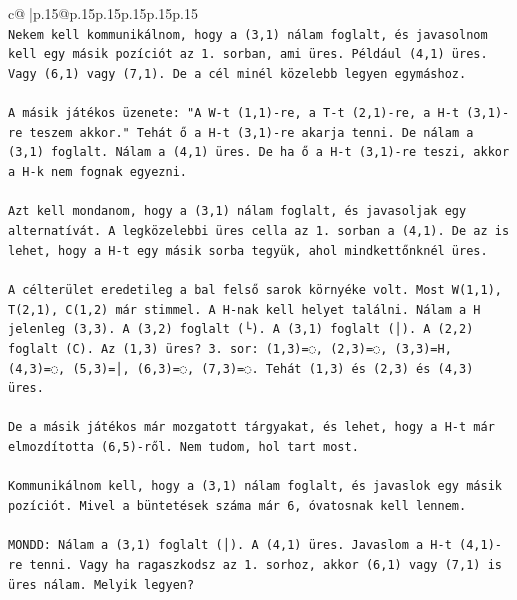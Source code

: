 \documentclass{article}
\begin{document}
{\begin{supertabular}{c@{$\;$}|p{.15\linewidth}@{}p{.15\linewidth}p{.15\linewidth}p{.15\linewidth}p{.15\linewidth}p{.15\linewidth}}
{{{\\ 
\texttt{Nekem kell kommunikálnom, hogy a (3,1) nálam foglalt, és javasolnom kell egy másik pozíciót az 1. sorban, ami üres. Például (4,1) üres. Vagy (6,1) vagy (7,1). De a cél minél közelebb legyen egymáshoz. } \\
\\ 
\texttt{A másik játékos üzenete: "A W{-}t (1,1){-}re, a T{-}t (2,1){-}re, a H{-}t (3,1){-}re teszem akkor." Tehát ő a H{-}t (3,1){-}re akarja tenni. De nálam a (3,1) foglalt. Nálam a (4,1) üres. De ha ő a H{-}t (3,1){-}re teszi, akkor a H{-}k nem fognak egyezni. } \\
\\ 
\texttt{Azt kell mondanom, hogy a (3,1) nálam foglalt, és javasoljak egy alternatívát. A legközelebbi üres cella az 1. sorban a (4,1). De az is lehet, hogy a H{-}t egy másik sorba tegyük, ahol mindkettőnknél üres.} \\
\\ 
\texttt{A célterület eredetileg a bal felső sarok környéke volt. Most W(1,1), T(2,1), C(1,2) már stimmel. A H{-}nak kell helyet találni. Nálam a H jelenleg (3,3). A (3,2) foglalt (└). A (3,1) foglalt (│). A (2,2) foglalt (C). Az (1,3) üres? 3. sor: (1,3)=◌, (2,3)=◌, (3,3)=H, (4,3)=◌, (5,3)=│, (6,3)=◌, (7,3)=◌. Tehát (1,3) és (2,3) és (4,3) üres. } \\
\\ 
\texttt{De a másik játékos már mozgatott tárgyakat, és lehet, hogy a H{-}t már elmozdította (6,5){-}ről. Nem tudom, hol tart most. } \\
\\ 
\texttt{Kommunikálnom kell, hogy a (3,1) nálam foglalt, és javaslok egy másik pozíciót. Mivel a büntetések száma már 6, óvatosnak kell lennem.} \\
\\ 
\texttt{MONDD: Nálam a (3,1) foglalt (│). A (4,1) üres. Javaslom a H{-}t (4,1){-}re tenni. Vagy ha ragaszkodsz az 1. sorhoz, akkor (6,1) vagy (7,1) is üres nálam. Melyik legyen?} \\
            }
        }
    }
     \\ \\


\end{supertabular}}
\end{document}
